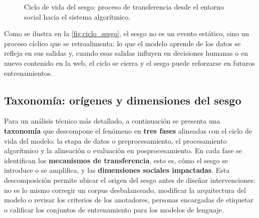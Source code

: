 \documentclass[12pt,a4paper]{report}
\begin{document}
\begin{figure}[H]
    \centering
    \caption{Ciclo de vida del sesgo: proceso de transferencia desde el entorno social hacia el sistema algorítmico.}
    \label{fig:ciclo_sesgo}
\end{figure}

Como se ilustra en la \autoref{fig:ciclo_sesgo}, el sesgo no es un evento estático, sino un proceso cíclico que se retroalimenta: lo que el modelo aprende de los datos se refleja en sus salidas y, cuando esas salidas influyen en decisiones humanas o en nuevo contenido en la web, el ciclo se cierra y el sesgo puede reforzarse en futuros entrenamientos.

\subsection{Taxonomía: orígenes y dimensiones del sesgo}
\label{sec:taxonomia_profunda}

Para un análisis técnico más detallado, a continuación se presenta una \textbf{taxonomía} que descompone el fenómeno en \textbf{tres fases} 
alineadas con el ciclo de vida del modelo: la etapa de datos o preprocesamiento, el procesamiento algorítmico y la alineación o evaluación en posprocesamiento. 
En cada fase se identifican los \textbf{mecanismos de transferencia}, esto es, cómo el sesgo se introduce o se amplifica, y las \textbf{dimensiones sociales impactadas}. 
Esta descomposición permite ubicar el origen del sesgo antes de diseñar intervenciones: no es lo mismo corregir un corpus desbalanceado, modificar la arquitectura del modelo o revisar los criterios de los anotadores, personas encargadas de etiquetar o calificar los conjuntos de entrenamiento para los modelos de lenguaje.
\end{document}
